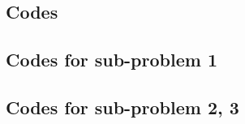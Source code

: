 \begin{appendices}
\section{Codes}
\subsection{Codes for sub-problem 1}

\subsection{Codes for sub-problem 2, 3}


\end{appendices}